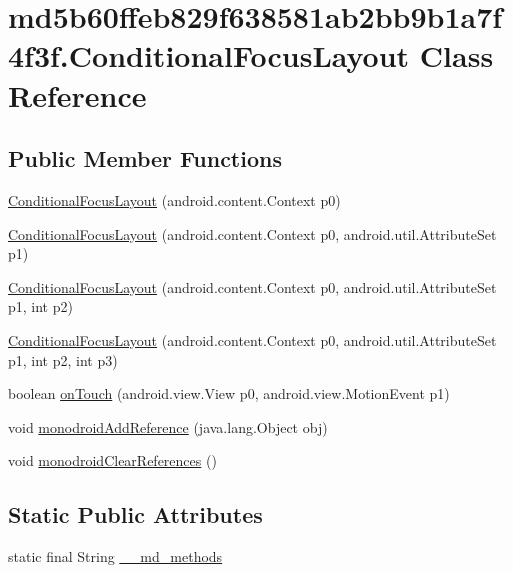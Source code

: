 \hypertarget{classmd5b60ffeb829f638581ab2bb9b1a7f4f3f_1_1_conditional_focus_layout}{
\section{md5b60ffeb829f638581ab2bb9b1a7f4f3f.ConditionalFocusLayout Class Reference}
\label{classmd5b60ffeb829f638581ab2bb9b1a7f4f3f_1_1_conditional_focus_layout}
}
\subsection*{Public Member Functions}
\begin{CompactItemize}
\item 
\hyperlink{classmd5b60ffeb829f638581ab2bb9b1a7f4f3f_1_1_conditional_focus_layout_b571a4b93e045a68fdbd705da07026b3}{ConditionalFocusLayout} (android.content.Context p0)
\item 
\hyperlink{classmd5b60ffeb829f638581ab2bb9b1a7f4f3f_1_1_conditional_focus_layout_3068fc1b02a87f447c1bdd623a7f354c}{ConditionalFocusLayout} (android.content.Context p0, android.util.AttributeSet p1)
\item 
\hyperlink{classmd5b60ffeb829f638581ab2bb9b1a7f4f3f_1_1_conditional_focus_layout_73d3de427ee5a3dfdb53afaccc575b96}{ConditionalFocusLayout} (android.content.Context p0, android.util.AttributeSet p1, int p2)
\item 
\hyperlink{classmd5b60ffeb829f638581ab2bb9b1a7f4f3f_1_1_conditional_focus_layout_2d591b0b102e0febcc72b7d07ff66429}{ConditionalFocusLayout} (android.content.Context p0, android.util.AttributeSet p1, int p2, int p3)
\item 
boolean \hyperlink{classmd5b60ffeb829f638581ab2bb9b1a7f4f3f_1_1_conditional_focus_layout_199b53215336706c0125f8e3b12b1dfc}{onTouch} (android.view.View p0, android.view.MotionEvent p1)
\item 
void \hyperlink{classmd5b60ffeb829f638581ab2bb9b1a7f4f3f_1_1_conditional_focus_layout_c7e7b0298a68db5a5b784eb1039ec067}{monodroidAddReference} (java.lang.Object obj)
\item 
void \hyperlink{classmd5b60ffeb829f638581ab2bb9b1a7f4f3f_1_1_conditional_focus_layout_a7ed542c35e17c2255ffde42f5b0d517}{monodroidClearReferences} ()
\end{CompactItemize}
\subsection*{Static Public Attributes}
\begin{CompactItemize}
\item 
static final String \hyperlink{classmd5b60ffeb829f638581ab2bb9b1a7f4f3f_1_1_conditional_focus_layout_e43b6d64754789fb4cba8a55c430534a}{\_\-\_\-md\_\-methods}
\end{CompactItemize}
